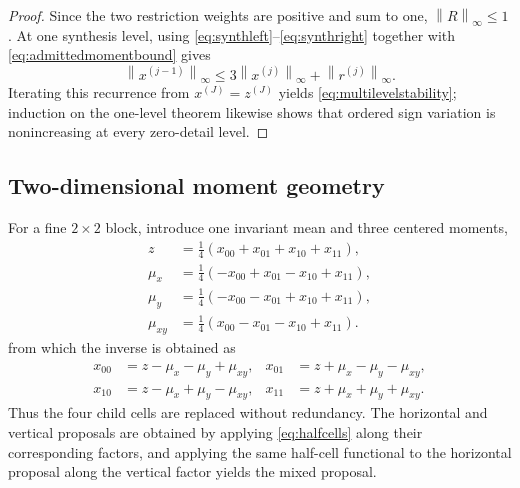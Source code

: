 \documentclass[journal]{IEEEtran}
\newcommand{\norm}[1]{\left\lVert#1\right\rVert}
\begin{document}
\begin{proof}
Since the two restriction weights are positive and sum to one,
\(\norm R_\infty\leq1\). At one synthesis level, using
\eqref{eq:synthleft}--\eqref{eq:synthright} together with
\eqref{eq:admittedmomentbound} gives
\[
 \norm{x^{(j-1)}}_\infty
 \leq3\norm{x^{(j)}}_\infty+\norm{r^{(j)}}_\infty.
\]
Iterating this recurrence from \(x^{(J)}=z^{(J)}\) yields
\eqref{eq:multilevelstability}; induction on the one-level theorem likewise
shows that ordered sign variation is nonincreasing at every zero-detail
level.
\end{proof}

\subsection{Two-dimensional moment geometry}

For a fine \(2\times2\) block, introduce one invariant mean and three
centered moments,
\begin{align}
 z&=\tfrac14(x_{00}+x_{01}+x_{10}+x_{11}),\nonumber\\
 \mu_x&=\tfrac14(-x_{00}+x_{01}-x_{10}+x_{11}),\nonumber\\
 \mu_y&=\tfrac14(-x_{00}-x_{01}+x_{10}+x_{11}),\nonumber\\
 \mu_{xy}&=\tfrac14(x_{00}-x_{01}-x_{10}+x_{11}).
 \label{eq:blockmoments}
\end{align}
from which the inverse is obtained as
\begin{align}
 x_{00}&=z-\mu_x-\mu_y+\mu_{xy},&
 x_{01}&=z+\mu_x-\mu_y-\mu_{xy},\nonumber\\
 x_{10}&=z-\mu_x+\mu_y-\mu_{xy},&
 x_{11}&=z+\mu_x+\mu_y+\mu_{xy}.
 \label{eq:blockinverse}
\end{align}
Thus the four child cells are replaced without redundancy. The horizontal
and vertical proposals are obtained by applying \eqref{eq:halfcells} along
their corresponding factors, and applying the same half-cell functional to
the horizontal proposal along the vertical factor yields the mixed proposal.
\end{document}
